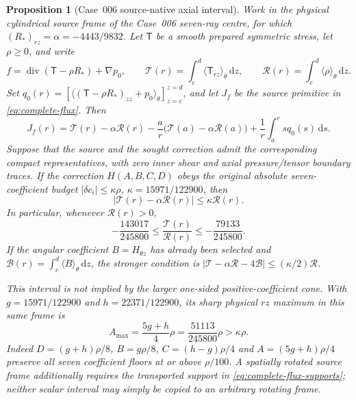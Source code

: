 \documentclass[11pt,a4paper]{article}
\theoremstyle{plain}
\newtheorem{proposition}[theorem]{Proposition}
\theoremstyle{definition}
\newcommand{\diver}{\operatorname{div}}
\newcommand{\dd}{\,\mathrm{d}}
\begin{document}
\begin{proposition}[Case~006 source-native axial interval]
\label{prop:case006-native-band}
Work in the physical cylindrical source frame of the Case~006
seven-ray centre, for which $(R_*)_{rz}=\alpha=-4443/9832$.
Let $\mathsf T$ be a smooth prepared symmetric stress, let
$\rho\ge0$, and write
\[
 f=\diver(\mathsf T-\rho R_*)+\nabla p_0,\qquad
 \mathcal T(r)=\int_c^d\langle\mathsf T_{rz}\rangle_\theta\dd z,
 \qquad \mathcal R(r)=\int_c^d\langle\rho\rangle_\theta\dd z.
\]
Set $q_0(r)=[\langle(\mathsf T-\rho R_*)_{zz}
 +p_0\rangle_\theta]_{z=c}^{z=d}$, and let $J_f$ be the
source primitive in \eqref{eq:complete-flux}. Then
\begin{equation}\label{eq:case006-source-native-primitive}
 J_f(r)=\mathcal T(r)-\alpha\mathcal R(r)
 -\frac ar\bigl(\mathcal T(a)-\alpha\mathcal R(a)\bigr)
 +\frac1r\int_a^r s q_0(s)\dd s.
\end{equation}
Suppose that the source and the sought correction admit the
corresponding compact representatives, with zero inner shear
and axial pressure/tensor boundary traces. If the correction
$H(A,B,C,D)$ obeys the \emph{original absolute} seven-coefficient
budget $|\delta c_i|\le\kappa\rho$,
$\kappa=15971/122900$, then
\[
 |\mathcal T(r)-\alpha\mathcal R(r)|\le\kappa\mathcal R(r).
\]
In particular, whenever $\mathcal R(r)>0$,
\begin{equation}\label{eq:case006-absolute-source-band}
 -\frac{143017}{245800}\le
 \frac{\mathcal T(r)}{\mathcal R(r)}\le
 -\frac{79133}{245800}.
\end{equation}
If the angular coefficient $B=H_{\theta z}$ has already been
selected and $\mathcal B(r)=\int_c^d\langle B\rangle_\theta\dd z$,
the stronger condition is
$|\mathcal T-\alpha\mathcal R-4\mathcal B|
\le(\kappa/2)\mathcal R$.

This interval is \emph{not} implied by the larger one-sided
positive-coefficient cone. With
$g=15971/122900$ and $h=22371/122900$, its sharp physical
$rz$ maximum in this same frame is
\[
 A_{\max}=\frac{5g+h}{4}\rho
 =\frac{51113}{245800}\rho>\kappa\rho.
\]
Indeed $D=(g+h)\rho/8$, $B=g\rho/8$,
$C=(h-g)\rho/4$ and $A=(5g+h)\rho/4$ preserve all seven
coefficient floors at or above $\rho/100$. A spatially rotated
source frame additionally requires the transported support in
\eqref{eq:complete-flux-supports}; neither scalar interval may
simply be copied to an arbitrary rotating frame.
\end{proposition}
\end{document}
